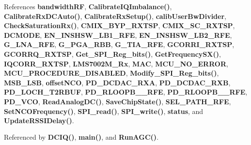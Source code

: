 References {\bf bandwidth\+RF}, {\bf Calibrate\+I\+Q\+Imbalance()}, {\bf Calibrate\+Rx\+D\+C\+Auto()}, {\bf Calibrate\+Rx\+Setup()}, {\bf calib\+User\+Bw\+Divider}, {\bf Check\+Saturation\+Rx()}, {\bf C\+M\+I\+X\+\_\+\+B\+Y\+P\+\_\+\+R\+X\+T\+SP}, {\bf C\+M\+I\+X\+\_\+\+S\+C\+\_\+\+R\+X\+T\+SP}, {\bf D\+C\+M\+O\+DE}, {\bf E\+N\+\_\+\+I\+N\+S\+H\+S\+W\+\_\+\+L\+B1\+\_\+\+R\+FE}, {\bf E\+N\+\_\+\+I\+N\+S\+H\+S\+W\+\_\+\+L\+B2\+\_\+\+R\+FE}, {\bf G\+\_\+\+L\+N\+A\+\_\+\+R\+FE}, {\bf G\+\_\+\+P\+G\+A\+\_\+\+R\+BB}, {\bf G\+\_\+\+T\+I\+A\+\_\+\+R\+FE}, {\bf G\+C\+O\+R\+R\+I\+\_\+\+R\+X\+T\+SP}, {\bf G\+C\+O\+R\+R\+Q\+\_\+\+R\+X\+T\+SP}, {\bf Get\+\_\+\+S\+P\+I\+\_\+\+Reg\+\_\+bits()}, {\bf Get\+Frequency\+S\+X()}, {\bf I\+Q\+C\+O\+R\+R\+\_\+\+R\+X\+T\+SP}, {\bf L\+M\+S7002\+M\+\_\+\+Rx}, {\bf M\+AC}, {\bf M\+C\+U\+\_\+\+N\+O\+\_\+\+E\+R\+R\+OR}, {\bf M\+C\+U\+\_\+\+P\+R\+O\+C\+E\+D\+U\+R\+E\+\_\+\+D\+I\+S\+A\+B\+L\+ED}, {\bf Modify\+\_\+\+S\+P\+I\+\_\+\+Reg\+\_\+bits()}, {\bf M\+S\+B\+\_\+\+L\+SB}, {\bf offset\+N\+CO}, {\bf P\+D\+\_\+\+D\+C\+D\+A\+C\+\_\+\+R\+XA}, {\bf P\+D\+\_\+\+D\+C\+D\+A\+C\+\_\+\+R\+XB}, {\bf P\+D\+\_\+\+L\+O\+C\+H\+\_\+\+T2\+R\+B\+UF}, {\bf P\+D\+\_\+\+R\+L\+O\+O\+P\+B\+\_\+\_\+\+R\+FE}, {\bf P\+D\+\_\+\+R\+L\+O\+O\+P\+B\+\_\+\_\+\+R\+FE}, {\bf P\+D\+\_\+\+V\+CO}, {\bf Read\+Analog\+D\+C()}, {\bf Save\+Chip\+State()}, {\bf S\+E\+L\+\_\+\+P\+A\+T\+H\+\_\+\+R\+FE}, {\bf Set\+N\+C\+O\+Frequency()}, {\bf S\+P\+I\+\_\+read()}, {\bf S\+P\+I\+\_\+write()}, {\bf status}, and {\bf Update\+R\+S\+S\+I\+Delay()}.



Referenced by {\bf D\+C\+I\+Q()}, {\bf main()}, and {\bf Run\+A\+G\+C()}.



